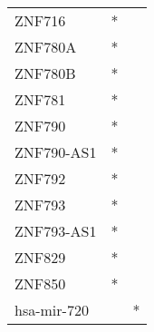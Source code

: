 \begin{longtable}{lcc}
ZNF716           &              * &            \\
ZNF780A          &              * &            \\
ZNF780B          &              * &            \\
ZNF781           &              * &            \\
ZNF790           &              * &            \\
ZNF790-AS1       &              * &            \\
ZNF792           &              * &            \\
ZNF793           &              * &            \\
ZNF793-AS1       &              * &            \\
ZNF829           &              * &            \\
ZNF850           &              * &            \\
hsa-mir-720      &                &          * \\
\end{longtable}
